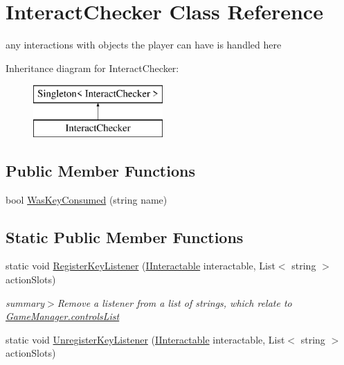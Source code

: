 \hypertarget{class_interact_checker}{}\section{Interact\+Checker Class Reference}
\label{class_interact_checker}


any interactions with objects the player can have is handled here  


Inheritance diagram for Interact\+Checker\+:\begin{figure}[H]
\begin{center}
\leavevmode
\includegraphics[height=2.000000cm]{class_interact_checker}
\end{center}
\end{figure}
\subsection*{Public Member Functions}
\begin{DoxyCompactItemize}
\item 
bool \mbox{\hyperlink{class_interact_checker_a00e90252be48f811666cc6805a3ca5fa}{Was\+Key\+Consumed}} (string name)
\end{DoxyCompactItemize}
\subsection*{Static Public Member Functions}
\begin{DoxyCompactItemize}
\item 
static void \mbox{\hyperlink{class_interact_checker_ae319eab732fd4bdb6e5d7689228531ee}{Register\+Key\+Listener}} (\mbox{\hyperlink{interface_i_interactable}{I\+Interactable}} interactable, List$<$ string $>$ action\+Slots)
\begin{DoxyCompactList}\small\item\em summary$>$Remove a listener from a list of strings, which relate to \mbox{\hyperlink{class_game_manager_aa59964143f46f6d366aa576ab08c5a15}{Game\+Manager.\+controls\+List}}\end{DoxyCompactList}\item 
static void \mbox{\hyperlink{class_interact_checker_ac2a87fa80a10b82394bf81b6658c5ee6}{Unregister\+Key\+Listener}} (\mbox{\hyperlink{interface_i_interactable}{I\+Interactable}} interactable, List$<$ string $>$ action\+Slots)
\end{DoxyCompactItemize}
